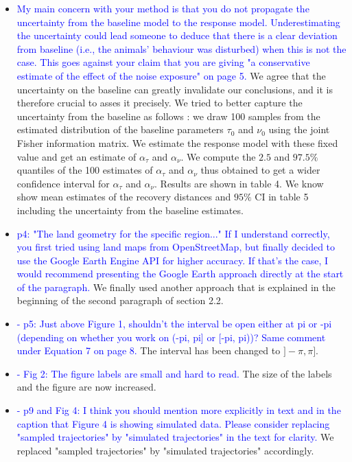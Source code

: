 \documentclass{amsart}
\theoremstyle{plain}
\theoremstyle{remark}
\newcommand {\1}{\mathbb{1}}
\begin{document}
\begin{itemize}
\item \textcolor{blue}{My main concern with your method is that you do not propagate the uncertainty from the baseline model to the response model. Underestimating the uncertainty could lead someone to deduce that there is a clear deviation from baseline (i.e., the animals' behaviour was disturbed) when this is not the case. This goes against your claim that you are giving "a conservative estimate of the effect of the noise exposure" on page 5.}
We agree that the uncertainty on the baseline can greatly invalidate our conclusions, and it is therefore crucial to asses it precisely. 
We tried to better capture the uncertainty from the baseline as follows : we draw 100 samples from the estimated distribution of the baseline parameters $\tau_0$ and $\nu_0$ using the joint Fisher information matrix.  We estimate the response model with these fixed value and get an estimate of $\alpha_\tau$ and $\alpha_\nu$. We compute the $2.5$ and $97.5 \%$ quantiles of the 100 estimates of $\alpha_\tau$ and $\alpha_\nu$ thus obtained to get a wider confidence interval for $\alpha_\tau$ and  $\alpha_\nu$. Results are shown in table 4. We know show mean estimates of the recovery distances and $95\%$ CI in table 5 including the uncertainty from the baseline estimates. 

\item \textcolor{blue}{ p4: "The land geometry for the specific region..." If I understand correctly, you first tried using land maps from OpenStreetMap, but finally decided to use the Google Earth Engine API for higher accuracy. If that's the case, I would recommend presenting the Google Earth approach directly at the start of the paragraph.}
We finally used another approach that is explained in the beginning of the second paragraph of section 2.2.

\item \textcolor{blue}{- p5: Just above Figure 1, shouldn't the interval be open either at pi or -pi (depending on whether you work on (-pi, pi] or [-pi, pi))? Same comment under Equation 7 on page 8.}
The interval has been changed to $]-\pi,\pi]$.

\item \textcolor{blue}{- Fig 2: The figure labels are small and hard to read.} The size of the labels and the figure are now increased.

\item \textcolor{blue}{- p9 and Fig 4: I think you should mention more explicitly in text and in the caption that Figure 4 is showing simulated data. Please consider replacing "sampled trajectories" by "simulated trajectories" in the text for clarity.} We replaced "sampled trajectories" by "simulated trajectories" accordingly.


\end{itemize}
\end{document}
